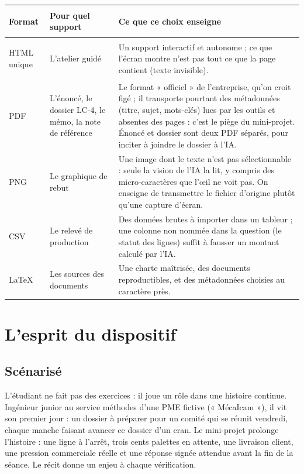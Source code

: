 \documentclass[11pt,a4paper]{article}
\begin{document}
\begin{center}
\renewcommand{\arraystretch}{1.4}
\small
\begin{tabularx}{\linewidth}{>{\bfseries\raggedright\arraybackslash}p{2.6cm} >{\raggedright\arraybackslash}p{3.6cm} >{\raggedright\arraybackslash}X}
\toprule
\textbf{Format} & \textbf{Pour quel support} & \textbf{Ce que ce choix enseigne}\\
\midrule
HTML unique & L'atelier guidé & Un support interactif et autonome ; ce que l'écran montre n'est pas tout ce que la page contient (texte invisible).\\
PDF & L'énoncé, le dossier LC-4, le mémo, la note de référence & Le format « officiel » de l'entreprise, qu'on croit figé ; il transporte pourtant des métadonnées (titre, sujet, mots-clés) lues par les outils et absentes des pages : c'est le piège du mini-projet. Énoncé et dossier sont deux PDF séparés, pour inciter à joindre le dossier à l'IA.\\
PNG & Le graphique de rebut & Une image dont le texte n'est pas sélectionnable : seule la vision de l'IA la lit, y compris des micro-caractères que l'œil ne voit pas. On enseigne de transmettre le fichier d'origine plutôt qu'une capture d'écran.\\
CSV & Le relevé de production & Des données brutes à importer dans un tableur ; une colonne non nommée dans la question (le statut des lignes) suffit à fausser un montant calculé par l'IA.\\
\LaTeX{} & Les sources des documents & Une charte maîtrisée, des documents reproductibles, et des métadonnées choisies au caractère près.\\
\bottomrule
\end{tabularx}
\end{center}

\section{L'esprit du dispositif}

\subsection{Scénarisé}
L'étudiant ne fait pas des exercices : il joue un rôle dans une histoire continue. Ingénieur
junior au service méthodes d'une PME fictive (« MécaIcam »), il vit son premier jour : un
dossier à préparer pour un comité qui se réunit vendredi, chaque manche faisant avancer ce
dossier d'un cran. Le mini-projet prolonge l'histoire : une ligne à l'arrêt, trois cents palettes
en attente, une livraison client, une pression commerciale réelle et une réponse signée attendue
avant la fin de la séance. Le récit donne un enjeu à chaque vérification.
\end{document}
